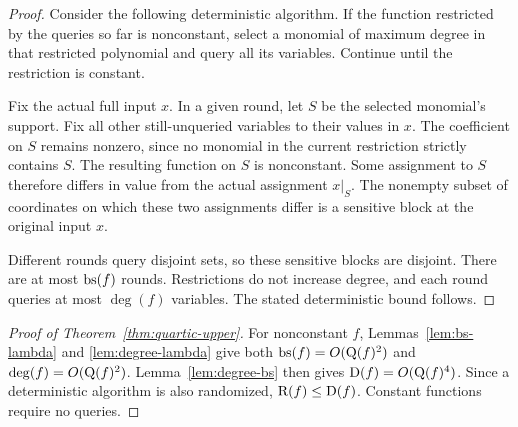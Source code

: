 \begin{proof}
Consider the following deterministic algorithm. If the function
restricted by the queries so far is nonconstant, select a monomial
of maximum degree in that restricted polynomial and query all its
variables. Continue until the restriction is constant.

Fix the actual full input $x$. In a given round, let $S$ be the
selected monomial's support. Fix all other still-unqueried variables
to their values in $x$. The coefficient on $S$ remains nonzero, since
no monomial in the current restriction strictly contains $S$.
The resulting function on $S$ is nonconstant. Some assignment to $S$
therefore differs in value from the actual assignment $x|_S$. The
nonempty subset of coordinates on which these two assignments differ
is a sensitive block at the original input $x$.

Different rounds query disjoint sets, so these sensitive blocks are
disjoint. There are at most $\operatorname{bs}(f)$ rounds. Restrictions do not
increase degree, and each round queries at most $\deg(f)$ variables.
The stated deterministic bound follows.
\end{proof}

\begin{proof}[Proof of Theorem~\ref{thm:quartic-upper}]
For nonconstant $f$, Lemmas~\ref{lem:bs-lambda} and
\ref{lem:degree-lambda} give both $\operatorname{bs}(f)=O(\mathrm Q(f)^2)$ and
$\deg(f)=O(\mathrm Q(f)^2)$. Lemma~\ref{lem:degree-bs} then gives
$\mathrm D(f)=O(\mathrm Q(f)^4)$. Since a deterministic algorithm is also randomized,
$\mathrm R(f)\le\mathrm D(f)$. Constant functions require no queries.
\end{proof}
